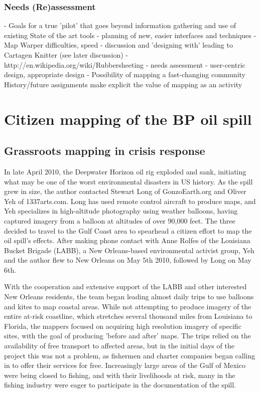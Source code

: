 \documentclass[11pt]{report}
\begin{document}
\subsection{Needs (Re)assessment}
- Goals for a true 'pilot' that goes beyond information gathering and use of existing State of the art tools
   - planning of new, easier interfaces and techniques
                - Map Warper difficulties, speed
            - discussion and 'designing with' leading to Cartagen Knitter (see later discussion)
		- http://en.wikipedia.org/wiki/Rubbersheeting
            - needs assessment - user-centric design, appropriate design
    - Possibility of mapping a fast-changing community
        History/future assignments make explicit the value of mapping as an activity

\chapter{Citizen mapping of the BP oil spill}
\section{Grassroots mapping in crisis response}

In late April 2010, the Deepwater Horizon oil rig exploded and sank, initiating what may be one of the worst environmental disasters in US history. As the spill grew in size, the author contacted Stewart Long of GonzoEarth.org and Oliver Yeh of 1337arts.com. Long has used remote control aircraft to produce maps, and Yeh specializes in high-altitude photography using weather balloons, having captured imagery from a balloon at altitudes of over 90,000 feet. The three decided to travel to the Gulf Coast area to spearhead a citizen effort to map the oil spill's effects. After making phone contact with Anne Rolfes of the Louisiana Bucket Brigade (LABB), a New Orleans-based environmental activist group, Yeh and the author flew to New Orleans on May 5th 2010, followed by Long on May 6th. 

With the cooperation and extensive support of the LABB and other interested New Orleans residents, the team began leading almost daily trips to use balloons and kites to map coastal areas. While not attempting to produce imagery of the entire at-risk coastline, which stretches several thousand miles from Louisiana to Florida, the mappers focused on acquiring high resolution imagery of specific sites, with the goal of producing 'before and after' maps. The trips relied on the availability of free transport to affected areas, but in the initial days of the project this was not a problem, as fishermen and charter companies began calling in to offer their services for free. Increasingly large areas of the Gulf of Mexico were being closed to fishing, and with their livelihoods at risk, many in the fishing industry were eager to participate in the documentation of the spill. 
\end{document}
